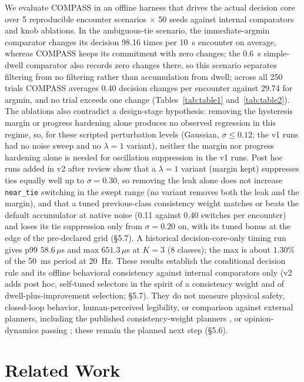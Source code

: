\documentclass[11pt]{article}
\newcommand{\code}[1]{\texttt{#1}}
\begin{document}
We evaluate COMPASS in an offline harness that drives the actual decision core over 5 reproducible encounter scenarios $\times$ 50 seeds against internal comparators and knob ablations. In the ambiguous-tie scenario, the immediate-argmin comparator changes its decision 98.16 times per 10~s encounter on average, whereas COMPASS keeps its commitment with zero changes; the 0.6~s simple-dwell comparator also records zero changes there, so this scenario separates filtering from no filtering rather than accumulation from dwell; across all 250 trials COMPASS averages 0.40 decision changes per encounter against 29.74 for argmin, and no trial exceeds one change (Tables~\ref{tab:table1} and~\ref{tab:table2}). The ablations also contradict a design-stage hypothesis: removing the hysteresis margin or progress hardening alone produces no observed regression in this regime, so, for these scripted perturbation levels (Gaussian, $\sigma\le0.12$; the v1 runs had no noise sweep and no $\lambda=1$ variant), neither the margin nor progress hardening alone is needed for oscillation suppression in the v1 runs. Post hoc runs added in v2 after review show that a $\lambda=1$ variant (margin kept) suppresses ties equally well up to $\sigma=0.30$, so removing the leak alone does not increase \code{near\_tie} switching in the swept range (no variant removes both the leak and the margin), and that a tuned previous-class consistency weight matches or beats the default accumulator at native noise (0.11 against 0.40 switches per encounter) and loses its tie suppression only from $\sigma=0.20$ on, with its tuned bonus at the edge of the pre-declared grid (\S5.7). A historical decision-core-only timing run gives p99 $58.6\,\mu$s and max $651.3\,\mu$s at $K=3$ (8 classes); the max is about $1.30\%$ of the 50~ms period at 20~Hz. These results establish the conditional decision rule and its offline behavioral consistency against internal comparators only (v2 adds post hoc, self-tuned selectors in the spirit of a consistency weight and of dwell-plus-improvement selection; \S5.7). They do not measure physical safety, closed-loop behavior, human-perceived legibility, or comparison against external planners, including the published consistency-weight planners \cite{degroot2024topology, martinezbaselga2026shine}, or opinion-dynamics passing \cite{cathcart2023opinion}; these remain the planned next step (\S5.6).

\section{Related Work}
\end{document}

